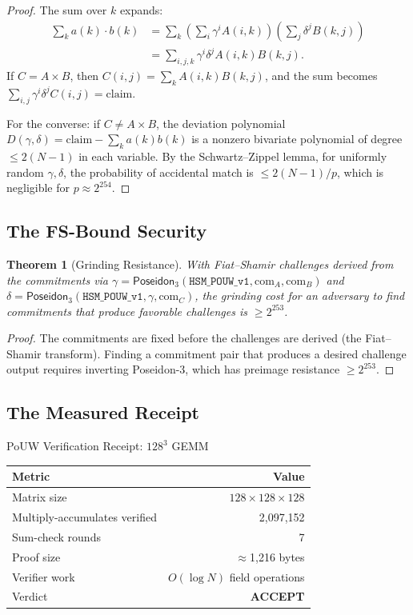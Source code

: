 \documentclass[11pt, a4paper]{article}
\theoremstyle{plain}
\newtheorem{theorem}{Theorem}
\theoremstyle{definition}
\theoremstyle{remark}
\begin{document}
\begin{proof}
The sum over $k$ expands:
\begin{align}
\sum_k a(k) \cdot b(k)
&= \sum_k \left(\sum_i \gamma^i A(i,k)\right)\left(\sum_j \delta^j B(k,j)\right)\\
&= \sum_{i,j,k} \gamma^i \delta^j A(i,k) B(k,j).
\end{align}
If $C = A \times B$, then $C(i,j) = \sum_k A(i,k) B(k,j)$, and the
sum becomes $\sum_{i,j} \gamma^i \delta^j C(i,j) = \text{claim}$.

For the converse: if $C \neq A \times B$, the deviation polynomial
 $D(\gamma, \delta) = \text{claim} - \sum_k a(k) b(k)$ is a nonzero
bivariate polynomial of degree $\le 2(N-1)$ in each variable. By the
Schwartz--Zippel lemma, for uniformly random $\gamma, \delta$, the
probability of accidental match is $\le 2(N-1)/p$, which is
negligible for $p \approx 2^{254}$.
\end{proof}

\subsection{The FS-Bound Security}

\begin{theorem}[Grinding Resistance]
\label{thm:fs-bound}
With Fiat--Shamir challenges derived from the commitments via
 $\gamma = \textsf{Poseidon}_3(\texttt{HSM\_POUW\_v1}, \text{com}_A, \text{com}_B)$ and $\delta = \textsf{Poseidon}_3(\texttt{HSM\_POUW\_v1}, \gamma, \text{com}_C)$,
the grinding cost for an adversary to find commitments that produce
favorable challenges is $\ge 2^{253}$.
\end{theorem}
\begin{proof}
The commitments are fixed before the challenges are derived (the
Fiat--Shamir transform). Finding a commitment pair that produces a
desired challenge output requires inverting Poseidon-3, which has
preimage resistance $\ge 2^{253}$.
\end{proof}

\subsection{The Measured Receipt}

\begin{resultbox}{PoUW Verification Receipt: $128^3$ GEMM}
\centering
\begin{tabular}{lr}
\toprule
\textbf{Metric} & \textbf{Value} \\
\midrule
Matrix size & $128 \times 128 \times 128$ \\
Multiply-accumulates verified & 2{,}097{,}152 \\
Sum-check rounds & 7 \\
Proof size & $\approx$1{,}216 bytes \\
Verifier work & $O(\log N)$ field operations \\
Verdict & \textcolor{hsmaGreen}{\textbf{ACCEPT}} \\
\bottomrule
\end{tabular}
\end{resultbox}
\end{document}
